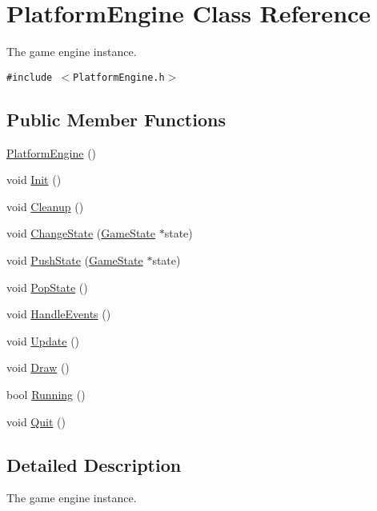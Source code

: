 \hypertarget{class_platform_engine}{
\section{PlatformEngine Class Reference}
\label{db/da1/class_platform_engine}
}
The game engine instance.  


{\tt \#include $<$PlatformEngine.h$>$}

\subsection*{Public Member Functions}
\begin{CompactItemize}
\item 
\hyperlink{class_platform_engine_9d45e2da5a9b7e52d8c5636f70068e11}{PlatformEngine} ()
\item 
void \hyperlink{class_platform_engine_059814bb3f1815b15d5a892f8ea6cb4a}{Init} ()
\item 
void \hyperlink{class_platform_engine_361b54312d9ec2fa842cd982f67100f9}{Cleanup} ()
\item 
void \hyperlink{class_platform_engine_d2b335545c9ab6bce7be7c014bc8c528}{ChangeState} (\hyperlink{class_game_state}{GameState} $\ast$state)
\item 
void \hyperlink{class_platform_engine_98e3d34b6ee831bcc1d26bac83bfe8d8}{PushState} (\hyperlink{class_game_state}{GameState} $\ast$state)
\item 
void \hyperlink{class_platform_engine_cf001abec596906465197d1220db2230}{PopState} ()
\item 
void \hyperlink{class_platform_engine_7fc47bff353292f1a1435d78664df36d}{HandleEvents} ()
\item 
void \hyperlink{class_platform_engine_d3ab75304226ad3fcac6b66ce3cedbc7}{Update} ()
\item 
void \hyperlink{class_platform_engine_cd756d58f81c5e28efe98ae075367a5c}{Draw} ()
\item 
bool \hyperlink{class_platform_engine_31ec37c0222f4694cc3c0e819e143038}{Running} ()
\item 
void \hyperlink{class_platform_engine_dbcdd91813cabbe51bb2f86eb23e772a}{Quit} ()
\end{CompactItemize}


\subsection{Detailed Description}
The game engine instance. 

